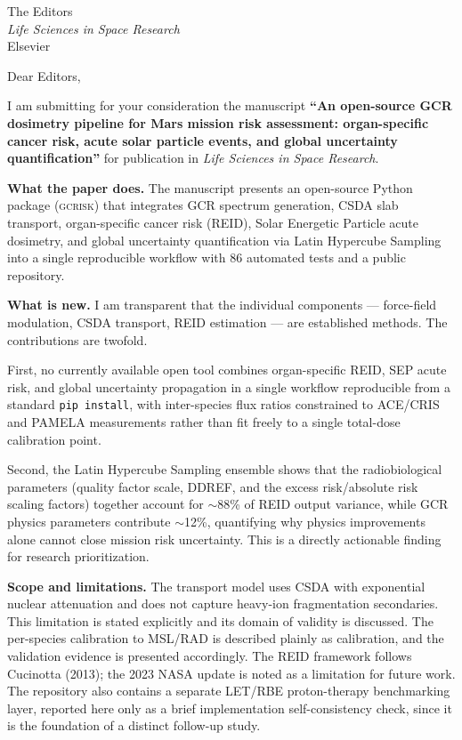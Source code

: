 \documentclass[11pt,letterpaper]{letter}
\date{\today}
\begin{document}
\begin{letter}{The Editors\\
  \textit{Life Sciences in Space Research}\\
  Elsevier}

\opening{Dear Editors,}

I am submitting for your consideration the manuscript
\textbf{``An open-source GCR dosimetry pipeline for Mars mission risk
assessment: organ-specific cancer risk, acute solar particle events, and
global uncertainty quantification''} for publication in \textit{Life
Sciences in Space Research}.

\medskip
\textbf{What the paper does.}
The manuscript presents an open-source Python package
(\textsc{gcrisk}) that integrates GCR spectrum
generation, CSDA slab transport, organ-specific cancer risk (REID),
Solar Energetic Particle acute dosimetry, and global uncertainty
quantification via Latin Hypercube Sampling into a single reproducible
workflow with 86 automated tests and a public repository.

\medskip
\textbf{What is new.}
I am transparent that the individual components — force-field
modulation, CSDA transport, REID estimation — are established methods.
The contributions are twofold.

First, no currently available open tool combines organ-specific REID,
SEP acute risk, and global uncertainty propagation in a single workflow
reproducible from a standard \texttt{pip install}, with inter-species
flux ratios constrained to ACE/CRIS and PAMELA measurements rather than
fit freely to a single total-dose calibration point.

Second, the Latin Hypercube Sampling ensemble shows that the radiobiological
parameters (quality factor scale, DDREF, and the excess risk/absolute risk
scaling factors) together account for $\sim$88\% of REID output
variance, while GCR physics parameters contribute $\sim$12\%,
quantifying why physics improvements alone cannot close mission risk
uncertainty. This is a directly actionable finding for research
prioritization.

\medskip
\textbf{Scope and limitations.}
The transport model uses CSDA with exponential nuclear attenuation and
does not capture heavy-ion fragmentation secondaries.
This limitation is stated explicitly and its domain of validity is
discussed.
The per-species calibration to MSL/RAD is described plainly as
calibration, and the validation evidence is presented accordingly.
The REID framework follows Cucinotta (2013); the 2023 NASA update is
noted as a limitation for future work.
The repository also contains a separate LET/RBE proton-therapy
benchmarking layer, reported here only as a brief implementation
self-consistency check, since it
is the foundation of a distinct follow-up study.


\end{letter}
\end{document}
